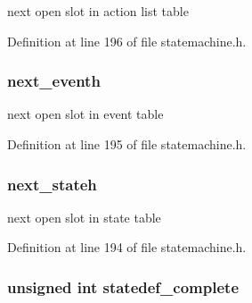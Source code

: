 next open slot in action list table 



Definition at line 196 of file statemachine.\-h.

\hypertarget{struct_s_m___s_t_a_t_e___t_a_b_l_e___d_e_f_a83a349559cb62ecc1dbc314298e294a3}{
\subsubsection[{next\-\_\-eventh}]{ next\-\_\-eventh}}\label{struct_s_m___s_t_a_t_e___t_a_b_l_e___d_e_f_a83a349559cb62ecc1dbc314298e294a3}


next open slot in event table 



Definition at line 195 of file statemachine.\-h.

\hypertarget{struct_s_m___s_t_a_t_e___t_a_b_l_e___d_e_f_aeb6ac427ff3b34dd686aa165325f0895}{
\subsubsection[{next\-\_\-stateh}]{ next\-\_\-stateh}}\label{struct_s_m___s_t_a_t_e___t_a_b_l_e___d_e_f_aeb6ac427ff3b34dd686aa165325f0895}


next open slot in state table 



Definition at line 194 of file statemachine.\-h.

\hypertarget{struct_s_m___s_t_a_t_e___t_a_b_l_e___d_e_f_aac1ff37dce11dcff67359f103bc2a193}{
\subsubsection[{statedef\-\_\-complete}]{\setlength{\rightskip}{0pt plus 5cm}unsigned int statedef\-\_\-complete}}\label{struct_s_m___s_t_a_t_e___t_a_b_l_e___d_e_f_aac1ff37dce11dcff67359f103bc2a193}


